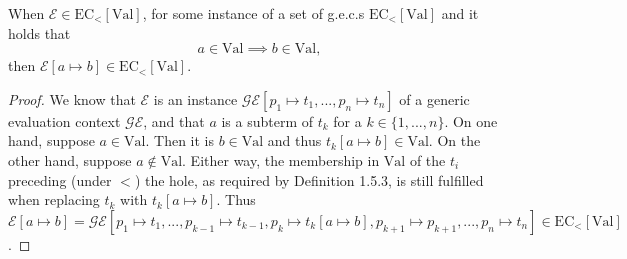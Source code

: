\begin{lemma}
\label{lem:gec1}
When $\mathcal{E} \in \textrm{EC}_<[{\textrm{Val}}]$, for some instance of a set of g.e.c.s $\textrm{EC}_<[\textrm{Val}]$ and it holds that
\[
a \in \textrm{Val} \implies b \in \textrm{Val},
\]
then $\mathcal{E}[a \mapsto b] \in \textrm{EC}_<[\textrm{Val}]$.

\begin{proof}
We know that $\mathcal{E}$ is an instance $\mathcal{GE}[p_1 \mapsto t_1, ..., p_n \mapsto t_n]$ of a generic evaluation context $\mathcal{GE}$, and that $a$ is a subterm of $t_k$ for a $k \in \{1, ..., n\}$. On one hand, suppose $a \in \textrm{Val}$. Then it is $b \in \textrm{Val}$ and thus $t_k[a \mapsto b] \in \textrm{Val}$. On the other hand, suppose $a \not\in \textrm{Val}$. Either way, the membership in $\textrm{Val}$ of the $t_i$ preceding (under $<$) the hole, as required by Definition 1.5.3, is still fulfilled when replacing $t_k$ with $t_k[a \mapsto b]$. Thus $\mathcal{E}[a \mapsto b] = \mathcal{GE}[p_1 \mapsto t_1, ..., p_{k-1} \mapsto t_{k-1}, p_k \mapsto t_k[a \mapsto b], p_{k+1} \mapsto p_{k+1}, ..., p_n \mapsto t_n] \in \textrm{EC}_<[\textrm{Val}]$.
\end{proof}
\end{lemma}
